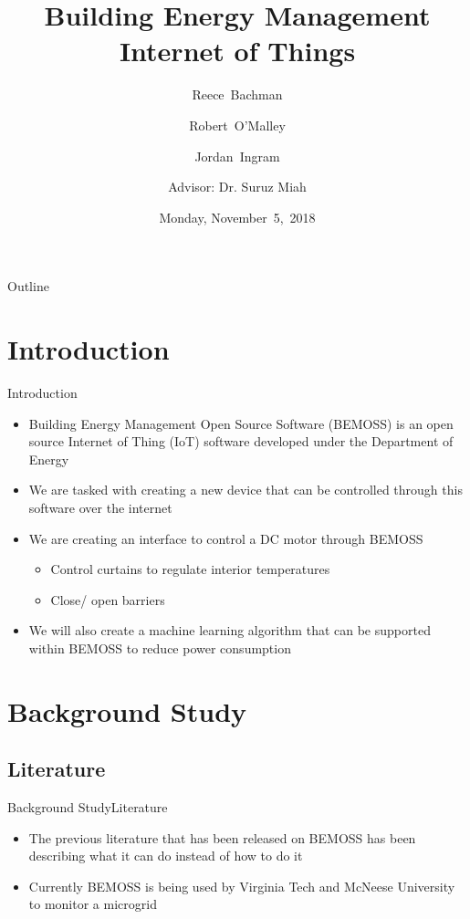 \documentclass{beamer}
\title[BEMOSS (Proposal)]{Building Energy Management Internet of Things}
\author[R.~Bachman, R.~O'Malley, J.~Ingram]{Reece~Bachman \and Robert~O'Malley \and Jordan~Ingram \and
Advisor: Dr. Suruz Miah}
\date[November~5,~2018]{Monday, November~5,~2018}
\begin{document}
\begin{frame}
  \titlepage
\end{frame}

\begin{frame}{Outline}
  \tableofcontents
\end{frame}

\section{Introduction}

\begin{frame}{Introduction}{}
  \begin{itemize}
        \item Building Energy Management Open Source Software (BEMOSS) is an open source Internet of Thing (IoT) software developed under the Department of Energy 
        \item We are tasked with creating a new device that can be controlled through this software over the internet 
        \item We are creating an interface to control a DC motor through BEMOSS
        \begin{itemize}
            \item Control curtains to regulate interior temperatures
            \item Close/ open barriers
            \end{itemize}
        \item We will also create a machine learning algorithm that can be supported within BEMOSS to reduce power consumption
        \end{itemize}
\end{frame}


\section{Background Study}

\subsection{Literature}

\begin{frame}{Background Study}{Literature}
    \begin{itemize}
        \item The previous literature that has been released on BEMOSS has been describing what it can do instead of how to do it
        \item Currently BEMOSS is being used by Virginia Tech and McNeese University to monitor a microgrid
    \end{itemize}
\end{frame}
\end{document}
